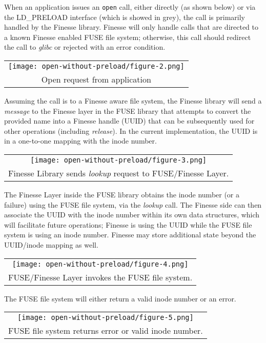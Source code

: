 \documentclass[a4paper,11pt]{article}
\begin{document}
When an application issues an \texttt{open} call, either directly (as shown below) or via the LD\_PRELOAD interface (which is showed in grey), the call is primarily handled by the Finesse library.  Finesse will only handle calls that are directed to a known Finesse enabled FUSE file system; otherwise, this call should redirect the call to \textit{glibc} or rejected with an error condition.

\begin{tabular}{c}
    \texttt{[image: open-without-preload/figure-2.png]}
    \tabularnewline
    Open request from application
\end{tabular}

Assuming the call is to a Finesse aware file system, the Finesse library will send a \textit{message} to the Finesse layer in the FUSE library that attempts to convert the provided name into a Finesse handle (UUID) that can be subsequently used for other operations (including \textit{release}).  In the current implementation, the UUID is in a one-to-one mapping with the inode number.


\begin{tabular}{c}
    \texttt{[image: open-without-preload/figure-3.png]}
    \tabularnewline
    Finesse Library sends \textit{lookup} request to FUSE/Finesse Layer.
\end{tabular}

The Finesse Layer inside the FUSE library obtains the inode number (or a failure) using the FUSE file system, via the \textit{lookup} call.  The Finesse side can then associate the UUID with the inode number within its own data structures, which will facilitate future operations; Finesse is using the UUID while the FUSE file system is using an inode number.  Finesse may store additional state beyond the UUID/inode mapping as well.

\begin{tabular}{c}
    \texttt{[image: open-without-preload/figure-4.png]}
    \tabularnewline
    FUSE/Finesse Layer invokes the FUSE file system.
\end{tabular}

The FUSE file system will either return a valid inode number or an error.

\begin{tabular}{c}
    \texttt{[image: open-without-preload/figure-5.png]}
    \tabularnewline
    FUSE file system returns error or valid inode number.
\end{tabular}
\end{document}
